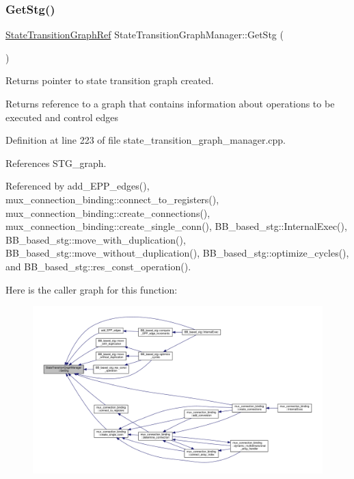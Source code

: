 \subsubsection{\texorpdfstring{Get\+Stg()}{GetStg()}}
{\footnotesize\ttfamily \hyperlink{state__transition__graph_8hpp_a50ba60cd5e113de254d5d7638bbbba86}{State\+Transition\+Graph\+Ref} State\+Transition\+Graph\+Manager\+::\+Get\+Stg (\begin{DoxyParamCaption}{ }\end{DoxyParamCaption})}



Returns pointer to state transition graph created. 

\begin{DoxyReturn}{Returns}
reference to a graph that contains information about operations to be executed and control edges 
\end{DoxyReturn}


Definition at line 223 of file state\+\_\+transition\+\_\+graph\+\_\+manager.\+cpp.



References S\+T\+G\+\_\+graph.



Referenced by add\+\_\+\+E\+P\+P\+\_\+edges(), mux\+\_\+connection\+\_\+binding\+::connect\+\_\+to\+\_\+registers(), mux\+\_\+connection\+\_\+binding\+::create\+\_\+connections(), mux\+\_\+connection\+\_\+binding\+::create\+\_\+single\+\_\+conn(), B\+B\+\_\+based\+\_\+stg\+::\+Internal\+Exec(), B\+B\+\_\+based\+\_\+stg\+::move\+\_\+with\+\_\+duplication(), B\+B\+\_\+based\+\_\+stg\+::move\+\_\+without\+\_\+duplication(), B\+B\+\_\+based\+\_\+stg\+::optimize\+\_\+cycles(), and B\+B\+\_\+based\+\_\+stg\+::res\+\_\+const\+\_\+operation().

Here is the caller graph for this function\+:
\nopagebreak
\begin{figure}[H]
\begin{center}
\leavevmode
\includegraphics[width=350pt]{d9/dfd/classStateTransitionGraphManager_a320b30fff409b26d2075dd4a028688db_icgraph}
\end{center}
\end{figure}
\mbox{\label{classStateTransitionGraphManager_ab58c3818c8f95a5184b14abc1df67219}} 
